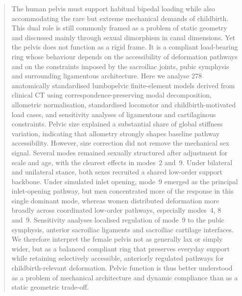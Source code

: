 \documentclass[openacc]{rsproca_new}
\begin{document}
\begin{abstract}
The human pelvis must support habitual bipedal loading while also accommodating the rare but extreme mechanical demands of childbirth. This dual role is still commonly framed as a problem of static geometry and discussed mainly through sexual dimorphism in canal dimensions. Yet the pelvis does not function as a rigid frame. It is a compliant load-bearing ring whose behaviour depends on the accessibility of deformation pathways and on the constraints imposed by the sacroiliac joints, pubic symphysis and surrounding ligamentous architecture. Here we analyse 278 anatomically standardised lumbopelvic finite-element models derived from clinical CT using correspondence-preserving modal decomposition, allometric normalisation, standardised locomotor and childbirth-motivated load cases, and sensitivity analyses of ligamentous and cartilaginous constraints. Pelvic size explained a substantial share of global stiffness variation, indicating that allometry strongly shapes baseline pathway accessibility. However, size correction did not remove the mechanical sex signal. Several modes remained sexually structured after adjustment for scale and age, with the clearest effects in modes~2 and~9. Under bilateral and unilateral stance, both sexes recruited a shared low-order support backbone. Under simulated inlet opening, mode~9 emerged as the principal inlet-opening pathway, but men concentrated more of the response in this single dominant mode, whereas women distributed deformation more broadly across coordinated low-order pathways, especially modes~4, 8 and~9. Sensitivity analyses localised regulation of mode~9 to the pubic symphysis, anterior sacroiliac ligaments and sacroiliac cartilage interfaces. We therefore interpret the female pelvis not as generally lax or simply wider, but as a balanced compliant ring that preserves everyday support while retaining selectively accessible, anteriorly regulated pathways for childbirth-relevant deformation. Pelvic function is thus better understood as a problem of mechanical architecture and dynamic compliance than as a static geometric trade-off.
\end{abstract}

\maketitle
\end{document}
